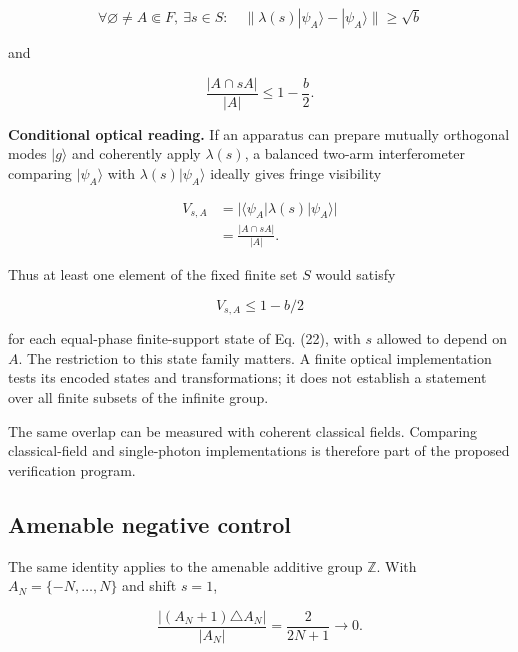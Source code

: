 \documentclass[11pt,a4paper]{article}
\begin{document}
\begin{equation}\label{eq:25}
\forall\varnothing\ne A\Subset F,\ \exists s\in S:
\quad\|\lambda(s)|\psi_A\rangle-|\psi_A\rangle\|\ge\sqrt b
\end{equation}

and

\begin{equation}\label{eq:26}
\frac{|A\cap sA|}{|A|}\le1-\frac b2.
\end{equation}

\textbf{Conditional optical reading.} If an apparatus can prepare mutually orthogonal modes \(|g\rangle\) and coherently apply \(\lambda(s)\), a balanced two-arm interferometer comparing \(|\psi_A\rangle\) with \(\lambda(s)|\psi_A\rangle\) ideally gives fringe visibility

\begin{equation}\label{eq:27}
\begin{aligned}
V_{s,A}
&=\bigl|\langle\psi_A|\lambda(s)|\psi_A\rangle\bigr|\\
&=\frac{|A\cap sA|}{|A|}.
\end{aligned}
\end{equation}

Thus at least one element of the fixed finite set \(S\) would satisfy

\begin{equation}\label{eq:28}
\boxed{V_{s,A}\le1-b/2}
\end{equation}

for each equal-phase finite-support state of Eq. (22), with \(s\) allowed to depend on \(A\). The restriction to this state family matters. A finite optical implementation tests its encoded states and transformations; it does not establish a statement over all finite subsets of the infinite group.

The same overlap can be measured with coherent classical fields. Comparing classical-field and single-photon implementations is therefore part of the proposed verification program.

\hypertarget{amenable-negative-control}{%
\subsection{Amenable negative control}\label{amenable-negative-control}}

The same identity applies to the amenable additive group \(\mathbb Z\). With \(A_N=\{-N,\ldots,N\}\) and shift \(s=1\),

\begin{equation}\label{eq:29}
\frac{|(A_N+1)\triangle A_N|}{|A_N|}
=\frac{2}{2N+1}\longrightarrow0.
\end{equation}
\end{document}
